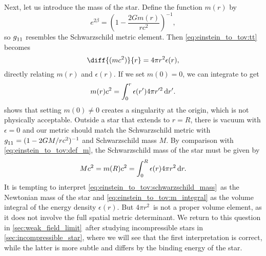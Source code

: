 Next, let us introduce the mass of the star.
Define the function $m(r)$ by
\begin{equation}
	e^{2 \beta} = \left( 1 - \frac{2 G m(r)}{r c^2} \right)^{-1} ,
	\label{eq:einstein_to_tov:def_m}
\end{equation}
so $g\indices{_1_1}$ resembles the Schwarzschild metric element.
Then \cref{eq:einstein_to_tov:tt} becomes
\begin{equation}
	\diff{(m c^2)}{r} = 4 \pi r^2 \epsilon(r) ,
	\label{eq:einstein_to_tov:m_rho}
\end{equation}
directly relating $m(r)$ and $\epsilon(r)$.
If we set $m(0) = 0$, we can integrate to get
\begin{equation}
	m(r) c^2 = \integral{\epsilon(r') 4 \pi r'^2}{r'}{0}{r} .
	\label{eq:einstein_to_tov:m_integral}
\end{equation}
\cite[page 602]{ref:mtw} shows that setting $m(0) \neq 0$ creates a singularity at the origin, which is not physically acceptable.
Outside a star that extends to $r = R$, there is vacuum with $\epsilon = 0$ and our metric should match the Schwarzschild metric with $g\indices{_1_1} = (1-2GM/rc^2)^{-1}$ and Schwarzschild mass $M$.
By comparison with \cref{eq:einstein_to_tov:def_m}, the Schwarzschild mass of the star must be given by
\begin{equation}
	M c^2 = m(R) c^2 = \integral{\epsilon(r) 4 \pi r^2}{r}{0}{R} .
	\label{eq:einstein_to_tov:schwarzschild_mass}
\end{equation}
It is tempting to interpret \cref{eq:einstein_to_tov:schwarzschild_mass} as the Newtonian mass of the star and \eqref{eq:einstein_to_tov:m_integral} as the volume integral of the energy density $\epsilon(r)$.
But $4 \pi r^2$ is not a proper volume element, as it does not involve the full spatial metric determinant.
We return to this question in \cref{sec:weak_field_limit} after studying incompressible stars in \cref{sec:incompressible_star}, where we will see that the first interpretation is correct, while the latter is more subtle and differs by the binding energy of the star.

